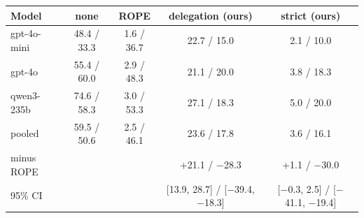 \begin{tabular}{@{}lcccc@{}}
\toprule
Model & none & ROPE & \textbf{delegation (ours)} & \textbf{strict (ours)} \\
\midrule
gpt-4o-mini & 48.4 / 33.3 & 1.6 / 36.7 & 22.7 / 15.0 & 2.1 / 10.0 \\
gpt-4o & 55.4 / 60.0 & 2.9 / 48.3 & 21.1 / 20.0 & 3.8 / 18.3 \\
qwen3-235b & 74.6 / 58.3 & 3.0 / 53.3 & 27.1 / 18.3 & 5.0 / 20.0 \\
\midrule
pooled & 59.5 / 50.6 & 2.5 / 46.1 & 23.6 / 17.8 & 3.6 / 16.1 \\
minus ROPE & & & +21.1 / $-$28.3 & +1.1 / $-$30.0 \\
95\% CI & & & [13.9, 28.7] / [$-$39.4, $-$18.3] & [$-$0.3, 2.5] / [$-$41.1, $-$19.4] \\
\bottomrule
\end{tabular}
